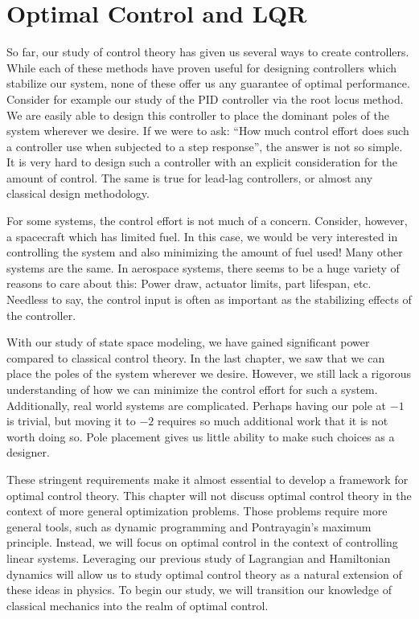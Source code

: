 \newpage
\printendnotes


\chapter{Optimal Control and LQR}\label{chap: optimal control}

So far, our study of control theory has given us several ways to create controllers. While each of these methods have proven useful for designing controllers which stabilize our system, none of these offer us any guarantee of optimal performance. Consider for example our study of the PID controller via the root locus method. We are easily able to design this controller to place the dominant poles of the system wherever we desire. If we were to ask: ``How much control effort does such a controller use when subjected to a step response'', the answer is not so simple. It is very hard to design such a controller with an explicit consideration for the amount of control. The same is true for lead-lag controllers, or almost any classical design methodology.

For some systems, the control effort is not much of a concern. Consider, however, a spacecraft which has limited fuel. In this case, we would be very interested in controlling the system and also minimizing the amount of fuel used! Many other systems are the same. In aerospace systems, there seems to be a huge variety of reasons to care about this: Power draw, actuator limits, part lifespan, etc. Needless to say, the control input is often as important as the stabilizing effects of the controller.

With our study of state space modeling, we have gained significant power compared to classical control theory. In the last chapter, we saw that we can place the poles of the system wherever we desire. However, we still lack a rigorous understanding of how we can minimize the control effort for such a system. Additionally, real world systems are complicated. Perhaps having our pole at $-1$ is trivial, but moving it to $-2$ requires so much additional work that it is not worth doing so. Pole placement gives us little ability to make such choices as a designer.

These stringent requirements make it almost essential to develop a framework for optimal control theory. This chapter will not discuss optimal control theory in the context of more general optimization problems. Those problems require more general tools, such as dynamic programming and Pontrayagin's maximum principle. Instead, we will focus on optimal control in the context of controlling linear systems. Leveraging our previous study of \gls{Lagrangian} and \gls{Hamiltonian} dynamics will allow us to study optimal control theory as a natural extension of these ideas in physics.  To begin our study, we will transition our knowledge of classical mechanics into the realm of optimal control.

